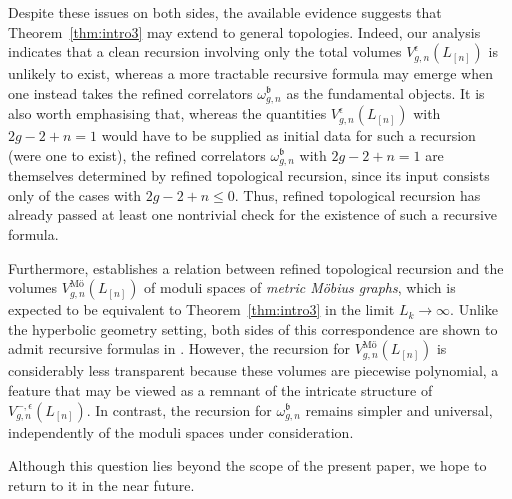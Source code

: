 \documentclass[12pt]{amsart}
\theoremstyle{plain}
\theoremstyle{definition}
\theoremstyle{remark}
\numberwithin{equation}{section}
\begin{document}
Despite these issues on both sides, the available evidence suggests that Theorem~\ref{thm:intro3} may extend to general topologies. Indeed, our analysis indicates that a clean recursion involving only the total volumes $V_{g,n}^{\epsilon}(L_{[n]})$ is unlikely to exist, whereas a more tractable recursive formula may emerge when one instead takes the refined correlators $\omega_{g,n}^\mathfrak{b}$ as the fundamental objects. It is also worth emphasising that, whereas the quantities $V_{g,n}^{\epsilon}(L_{[n]})$ with $2g-2+n=1$ would have to be supplied as initial data for such a recursion (were one to exist), the refined correlators $\omega_{g,n}^{\mathfrak{b}}$ with $2g-2+n=1$ are themselves determined by refined topological recursion, since its input consists only of the cases with $2g-2+n\leq0$. Thus, refined topological recursion has already passed at least one nontrivial check for the existence of such a recursive formula.

Furthermore, \cite{CGGO26} establishes a relation between refined topological recursion and the volumes $V^{\text{M\"{o}}}_{g,n}(L_{[n]})$ of moduli spaces of \emph{metric M\"{o}bius graphs}, which is expected to be equivalent to Theorem~\ref{thm:intro3} in the limit $L_{k}\to\infty$. Unlike the hyperbolic geometry setting, both sides of this correspondence are shown to admit recursive formulas in \cite{CGGO26}. However, the recursion for $V^{\text{M\"{o}}}_{g,n}(L_{[n]})$ is considerably less transparent because these volumes are piecewise polynomial, a feature that may be viewed as a remnant of the intricate structure of $V_{g,n}^{-,\epsilon}(L_{[n]})$. In contrast, the recursion for $\omega_{g,n}^\mathfrak{b}$ remains simpler and universal, independently of the moduli spaces under consideration. %

Although this question lies beyond the scope of the present paper, we hope to return to it in the near future.



\end{document}
